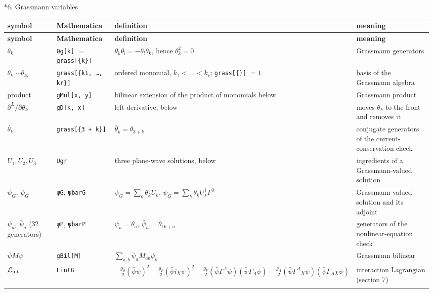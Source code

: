 \documentclass[10pt,a4paper]{article}
\makeatletter
\renewcommand\section{\@startsection{section}{1}{\z@}{-3.5ex \@plus -1ex \@minus -.2ex}{2.3ex \@plus.2ex}{\normalfont\Large\bfseries\raggedright}}
\makeatother
\begin{document}
\section*{6. Grassmann variables}
{\small
\begin{longtable}{>{\raggedright\arraybackslash}p{}>{\raggedright\arraybackslash}p{}>{\raggedright\arraybackslash}p{}>{\raggedright\arraybackslash}p{}}
\toprule
\textbf{symbol} & \textbf{Mathematica} & \textbf{definition} & \textbf{meaning} \\
\midrule\endfirsthead
\toprule
\textbf{symbol} & \textbf{Mathematica} & \textbf{definition} & \textbf{meaning} \\
\midrule\endhead
\endfoot
\bottomrule\endlastfoot
$\theta_k$ & \texttt{θg[k]} $=$ \texttt{grass[\{k\}]} & $\theta_k\theta_l=-\theta_l\theta_k$, hence $\theta_k^2=0$ & Grassmann generators \\
$\theta_{k_1}\cdots\theta_{k_r}$ & \texttt{grass[\{k1, …, kr\}]} & ordered monomial, $k_1<\dots<k_r$; \texttt{grass[\{\}]} $=1$ & basis of the Grassmann algebra \\
product & \texttt{gMul[x, y]} & bilinear extension of the product of monomials below & Grassmann product \\
$\partial^{L}/\partial\theta_k$ & \texttt{gD[k, x]} & left derivative, below & moves $\theta_k$ to the front and removes it \\
$\bar\theta_k$ & \texttt{grass[\{3 + k\}]} & $\bar\theta_k=\theta_{3+k}$ & conjugate generators of the current-conservation check \\
$U_1,U_2,U_3$ & \texttt{Ugr} & three plane-wave solutions, below & ingredients of a Grassmann-valued solution \\
$\psi_G$, $\bar\psi_G$ & \texttt{ψG}, \texttt{ψbarG} & $\psi_G=\sum_k\theta_kU_k$, $\bar\psi_G=\sum_k\bar\theta_kU_k^\dagger\Gamma^0$ & Grassmann-valued solution and its adjoint \\
$\psi_a$, $\bar\psi_a$ (32 generators) & \texttt{ψP}, \texttt{ψbarP} & $\psi_a=\theta_a$, $\bar\psi_a=\theta_{16+a}$ & generators of the nonlinear-equation check \\
$\bar\psi M\psi$ & \texttt{gBil[M]} & $\sum_{a,b}\bar\psi_aM_{ab}\psi_b$ & Grassmann bilinear \\
$\mathcal L_{\rm int}$ & \texttt{LintG} & $-\frac{g_S}2(\bar\psi\psi)^2-\frac{g_P}2(\bar\psi i\chi\psi)^2-\frac{g_V}2(\bar\psi\Gamma^A\psi)(\bar\psi\Gamma_A\psi)-\frac{g_A}2(\bar\psi\Gamma^A\chi\psi)(\bar\psi\Gamma_A\chi\psi)$ & interaction Lagrangian (section 7) \\*
\end{longtable}}
\end{document}
